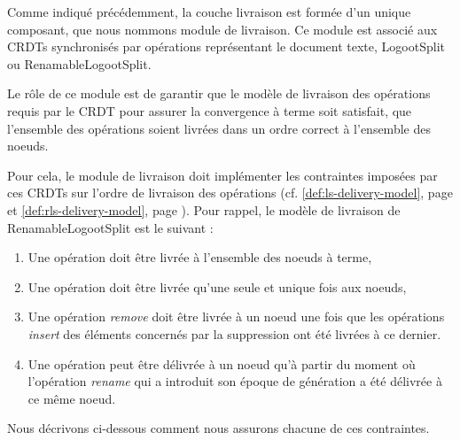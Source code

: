 \label{sec:mute-delivery-model}

Comme indiqué précédemment, la couche livraison est formée d'un unique composant, que nous nommons module de livraison.
Ce module est associé aux \acp{CRDT} synchronisés par opérations représentant le document texte, \ie LogootSplit ou RenamableLogootSplit.

Le rôle de ce module est de garantir que le modèle de livraison des opérations requis par le \ac{CRDT} pour assurer la convergence à terme  soit satisfait, \ie que l'ensemble des opérations soient livrées dans un ordre correct à l'ensemble des noeuds.

Pour cela, le module de livraison doit implémenter les contraintes imposées par ces \acp{CRDT} sur l'ordre de livraison des opérations (cf. \autoref{def:ls-delivery-model}, page \pageref{def:ls-delivery-model} et \autoref{def:rls-delivery-model}, page \pageref{def:ls-delivery-model}).
Pour rappel, le modèle de livraison de RenamableLogootSplit est le suivant :
\begin{enumerate}
    \item Une opération doit être livrée à l'ensemble des noeuds à terme,
    \item Une opération doit être livrée qu'une seule et unique fois aux noeuds,
    \item Une opération \emph{remove} doit être livrée à un noeud une fois que les opérations \emph{insert} des éléments concernés par la suppression ont été livrées à ce dernier.
    \item Une opération peut être délivrée à un noeud qu'à partir du moment où l'opération \emph{rename} qui a introduit son époque de génération a été délivrée à ce même noeud.
\end{enumerate}

Nous décrivons ci-dessous comment nous assurons chacune de ces contraintes.
